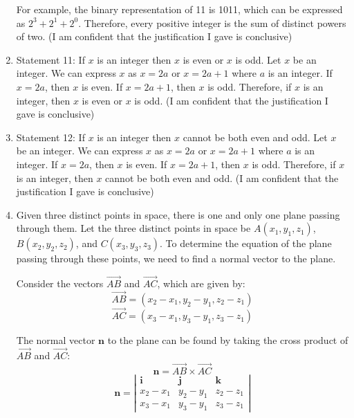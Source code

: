 \documentclass{article}
\begin{document}
\begin{enumerate}
          For example, the binary representation of 11 is 1011, which can be expressed as \(2^3 + 2^1 + 2^0\).\newline
          Therefore, every positive integer is the sum of distinct powers of two.\newline
          (I am confident that the justification I gave is conclusive)
    \item Statement 11: If $x$ is an integer then $x$ is even or $x$ is odd.\newline
          Let \(x\) be an integer. We can express \(x\) as \(x = 2a\) or \(x = 2a + 1\) where \(a\) is an integer.\newline
          If \(x = 2a\), then \(x\) is even. If \(x = 2a + 1\), then \(x\) is odd.\newline
          Therefore, if \(x\) is an integer, then \(x\) is even or \(x\) is odd.\newline
          (I am confident that the justification I gave is conclusive)
    \item Statement 12: If $x$ is an integer then $x$ cannot be both even and odd.\newline
          Let \(x\) be an integer. We can express \(x\) as \(x = 2a\) or \(x = 2a + 1\) where \(a\) is an integer.\newline
          If \(x = 2a\), then \(x\) is even. If \(x = 2a + 1\), then \(x\) is odd.\newline
          Therefore, if \(x\) is an integer, then \(x\) cannot be both even and odd.\newline
          (I am confident that the justification I gave is conclusive)
    \item Given three distinct points in space, there is one and only one plane passing through them.\newline
          Let the three distinct points in space be \(A(x_1, y_1, z_1)\), \(B(x_2, y_2, z_2)\), and \(C(x_3, y_3, z_3)\). To determine the equation of the plane passing through these points, we need to find a normal vector to the plane.

          Consider the vectors \(\overrightarrow{AB}\) and \(\overrightarrow{AC}\), which are given by:
          \[
              \overrightarrow{AB} = (x_2 - x_1, y_2 - y_1, z_2 - z_1)
          \]
          \[
              \overrightarrow{AC} = (x_3 - x_1, y_3 - y_1, z_3 - z_1)
          \]

          The normal vector \(\mathbf{n}\) to the plane can be found by taking the cross product of \(\overrightarrow{AB}\) and \(\overrightarrow{AC}\):
          \[
              \mathbf{n} = \overrightarrow{AB} \times \overrightarrow{AC}
          \]
          \[
              \mathbf{n} = \left|\begin{array}{ccc}
                  \mathbf{i} & \mathbf{j} & \mathbf{k} \\
                  x_2 - x_1  & y_2 - y_1  & z_2 - z_1  \\
                  x_3 - x_1  & y_3 - y_1  & z_3 - z_1
              \end{array}\right|
          \]


\end{enumerate}
\end{document}
